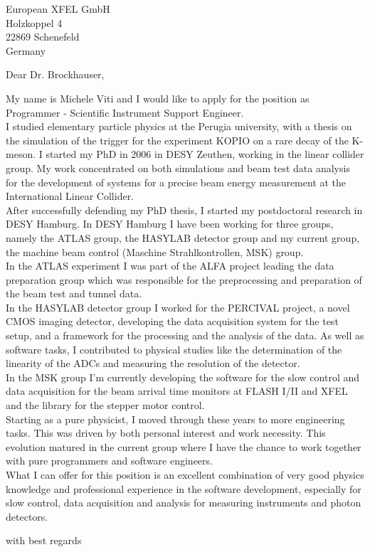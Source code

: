 \documentclass[ebner,paper=a4,fontsize=11pt,ngerman,BCOR=10mm]{scrlttr2}%
\begin{document}
\pagestyle{empty}

\begin{letter}{European XFEL GmbH \\
Holzkoppel 4 \\
22869 Schenefeld \\
Germany}


\setlength{\parindent}{15pt}

\opening{Dear Dr. Brockhauser,}

My name is Michele Viti and I would like to apply for the position as Programmer
- Scientific Instrument Support Engineer.\\
\indent I studied elementary particle physics at the Perugia university, with a
thesis on the simulation of the trigger for the experiment KOPIO on a rare decay of
the K-meson. I started my PhD in 2006 in DESY Zeuthen, working in the linear
collider group. My work concentrated on both simulations and beam test data
analysis for the development of systems for a precise beam energy measurement
at the International Linear Collider.\\
\indent After successfully defending my PhD thesis, I started my postdoctoral
research in DESY Hamburg. In DESY Hamburg I have been working for three groups, namely
the ATLAS group, the HASYLAB detector group and my current group, the machine
beam control (Maschine Strahlkontrollen, MSK) group.\\
In the ATLAS experiment I was part of the ALFA project leading the data
preparation group which was responsible for the preprocessing and preparation of
the beam test and tunnel data.  \\
In the HASYLAB detector group I worked for the PERCIVAL project, a novel CMOS
imaging detector, developing the data acquisition system for the test setup, and
a framework for the processing and the analysis of the data. As well as software
tasks, I contributed to physical studies like the determination of the linearity
of the ADCs and measuring the resolution of the detector.\\
In the MSK group I'm currently developing the software for the slow
control and data acquisition for the beam arrival time monitors at FLASH I/II
and XFEL and the library for the stepper motor control.\\
\indent Starting as a pure physicist, I moved through these years to more
engineering tasks. This was driven by both personal interest and work necessity. This
evolution matured in the current group where I have the chance to work
together with pure programmers and software engineers.\\
\indent What I can offer for this position is an excellent combination of very
good physics knowledge and professional experience in the software development,
especially for slow control, data acquisition and analysis for measuring
instruments and photon detectors.

\closing{with best regards}
\enlargethispage{6\baselineskip}

\end{letter}
\end{document}
